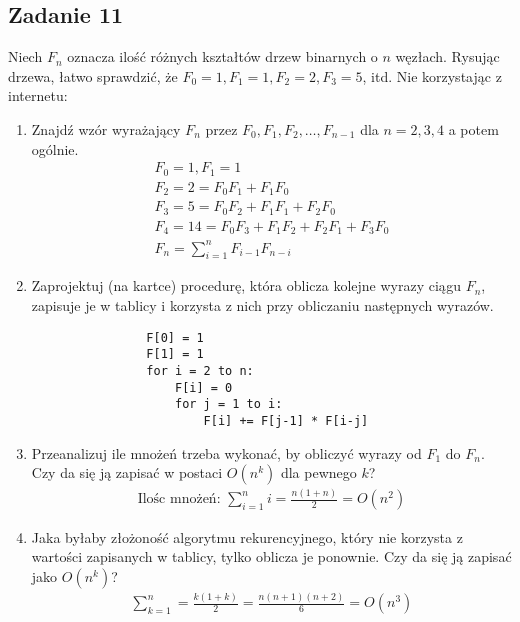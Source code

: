 \documentclass{article}
\begin{document}
\subsection*{Zadanie 11}
Niech $F_n$ oznacza ilość różnych kształtów drzew binarnych o $n$ węzłach. Rysując drzewa,
łatwo sprawdzić, że $F_0 = 1, F_1 = 1, F_2 = 2, F_3 = 5$, itd. Nie korzystając z internetu:
\begin{enumerate}[label=(\alph*)]
    \item Znajdź wzór wyrażający $F_n$ przez $F_0, F_1, F_2, \dots, F_{n-1}$ dla $n = 2, 3, 4$ a potem ogólnie.
          \begin{gather*}
              F_0 = 1, F_1 = 1 \\
              F_2 = 2 = F_0F_1 + F_1F_0 \\
              F_3 = 5 = F_0F_2 + F_1F_1 + F_2F_0 \\
              F_4 = 14 = F_0F_3 + F_1F_2 + F_2F_1 + F_3F_0 \\
              F_n = \sum_{i=1}^{n} F_{i-1}F_{n-i}
          \end{gather*}
    \item Zaprojektuj (na kartce) procedurę, która oblicza kolejne wyrazy ciągu $F_n$, zapisuje
          je w tablicy i korzysta z nich przy obliczaniu następnych wyrazów.
          \begin{lstlisting}
                F[0] = 1
                F[1] = 1
                for i = 2 to n:
                    F[i] = 0
                    for j = 1 to i:
                        F[i] += F[j-1] * F[i-j]
          \end{lstlisting}
    \item Przeanalizuj ile mnożeń trzeba wykonać, by obliczyć wyrazy od $F_1$ do $F_n$. Czy da
          się ją zapisać w postaci $O(n^k)$ dla pewnego $k$?
          \begin{gather*}
                \text{Ilośc mnożeń: } \sum_{i=1}^{n} i = \frac{n(1+n)}{2} = O(n^2)
          \end{gather*}
    \item Jaka byłaby złożoność algorytmu rekurencyjnego, który nie korzysta z wartości
          zapisanych w tablicy, tylko oblicza je ponownie. Czy da się ją zapisać jako $O(n^k)$?
          \begin{gather*}
                \sum_{k=1}^{n} = \frac{k(1+k)}{2} = \frac{n(n+1)(n+2)}{6} = O(n^3)
          \end{gather*}
\end{enumerate}
\end{document}
